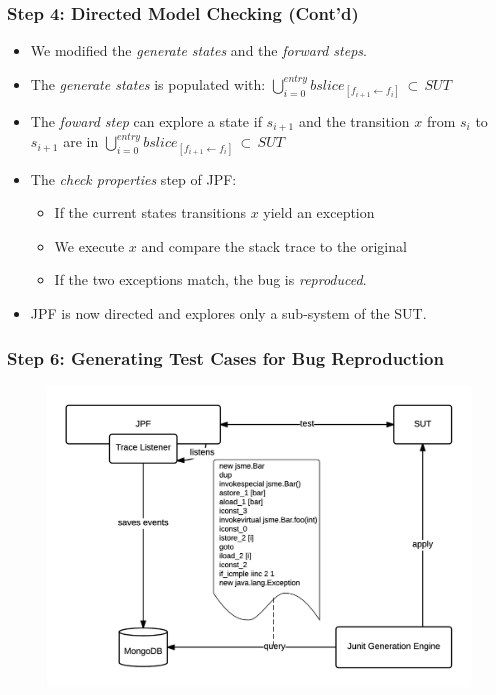 \documentclass{beamer}
\begin{document}
\begin{frame}
\frametitle{Step 4: Directed Model Checking (Cont'd)}

\begin{itemize}


\item We modified the \textit{generate states} and the \textit{forward steps}.
\item The \textit{generate states} is populated with: $\bigcup_{i=0}^{entry} bslice_{[f_{i+1} \leftarrow f_i]} \, \subset \, SUT$
\item The \textit{foward step} can explore a state if $s_{i+1}$ and the transition $x$ from $s_i$ to $s_{i+1}$ are in $\bigcup_{i=0}^{entry} bslice_{[f_{i+1} \leftarrow f_i]} \, \subset \, SUT$

\item The \textit{check properties} step of JPF:

\begin{itemize}
\item If the current states transitions $x$ yield an exception
\item We execute $x$ and compare the stack trace to the original
\item If the two exceptions match, the bug is \textit{reproduced}.
\end{itemize}
\vspace{0.3cm}
\item JPF is now directed and explores only a sub-system of the SUT.
\end{itemize}

\end{frame}


\begin{frame}
\frametitle{Step 6: Generating Test Cases for Bug Reproduction}


  \begin{figure}
  \includegraphics[width=0.95\linewidth]{media/unittest.png}
  \end{figure}


\end{frame}
\end{document}
